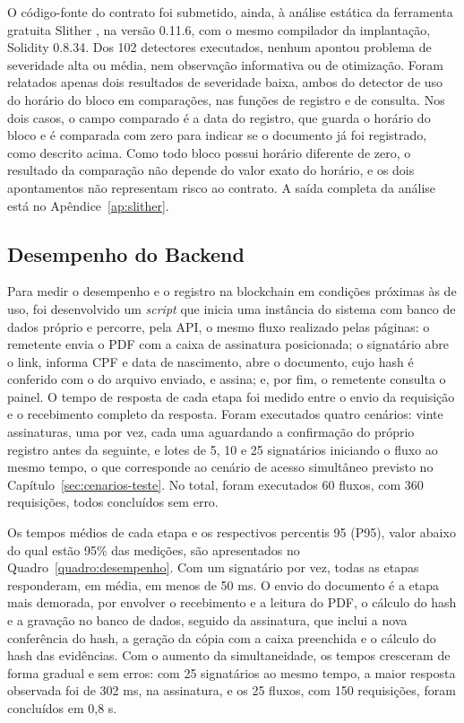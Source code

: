 \documentclass[
    12pt,
    a4paper,
    oneside,
    chapter=TITLE,
    section=TITLE,
    subsection=TITLE,
    subsubsection=TITLE,
    sumario=tradicional,
    english,
    brazil
]{abntex2}
\begin{document}
O código-fonte do contrato foi submetido, ainda, à análise estática da ferramenta gratuita Slither \cite{feist2019}, na versão 0.11.6, com o mesmo compilador da implantação, Solidity 0.8.34. Dos 102 detectores executados, nenhum apontou problema de severidade alta ou média, nem observação informativa ou de otimização. Foram relatados apenas dois resultados de severidade baixa, ambos do detector de uso do horário do bloco em comparações, nas funções de registro e de consulta. Nos dois casos, o campo comparado é a data do registro, que guarda o horário do bloco e é comparada com zero para indicar se o documento já foi registrado, como descrito acima. Como todo bloco possui horário diferente de zero, o resultado da comparação não depende do valor exato do horário, e os dois apontamentos não representam risco ao contrato. A saída completa da análise está no Apêndice~\ref{ap:slither}.

\subsection{Desempenho do Backend}
\label{sec:res-desempenho}

Para medir o desempenho e o registro na blockchain em condições próximas às de uso, foi desenvolvido um \emph{script} que inicia uma instância do sistema com banco de dados próprio e percorre, pela API, o mesmo fluxo realizado pelas páginas: o remetente envia o PDF com a caixa de assinatura posicionada; o signatário abre o link, informa CPF e data de nascimento, abre o documento, cujo hash é conferido com o do arquivo enviado, e assina; e, por fim, o remetente consulta o painel. O tempo de resposta de cada etapa foi medido entre o envio da requisição e o recebimento completo da resposta. Foram executados quatro cenários: vinte assinaturas, uma por vez, cada uma aguardando a confirmação do próprio registro antes da seguinte, e lotes de 5, 10 e 25 signatários iniciando o fluxo ao mesmo tempo, o que corresponde ao cenário de acesso simultâneo previsto no Capítulo~\ref{sec:cenarios-teste}. No total, foram executados 60 fluxos, com 360 requisições, todos concluídos sem erro.

Os tempos médios de cada etapa e os respectivos percentis 95 (P95), valor abaixo do qual estão 95\% das medições, são apresentados no Quadro~\ref{quadro:desempenho}. Com um signatário por vez, todas as etapas responderam, em média, em menos de 50 ms. O envio do documento é a etapa mais demorada, por envolver o recebimento e a leitura do PDF, o cálculo do hash e a gravação no banco de dados, seguido da assinatura, que inclui a nova conferência do hash, a geração da cópia com a caixa preenchida e o cálculo do hash das evidências. Com o aumento da simultaneidade, os tempos cresceram de forma gradual e sem erros: com 25 signatários ao mesmo tempo, a maior resposta observada foi de 302 ms, na assinatura, e os 25 fluxos, com 150 requisições, foram concluídos em 0,8 s.
\end{document}
